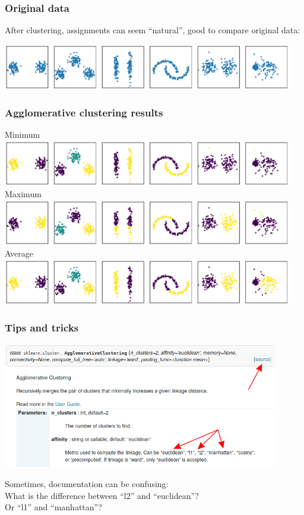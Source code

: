 \documentclass[Nike]{tuberlinbeamer}
\begin{document}
\begin{frame}
  \frametitle{Original data}
  After clustering, assignments can seem ``natural'', good to compare original data:
  \begin{center}
    \centering\includegraphics[width=0.95\textwidth]{sample_clusters.pdf}
  \end{center}
\end{frame}

\begin{frame}
  \frametitle{Agglomerative clustering results}
  \begin{center}
    \scriptsize Minimum
    \centering\includegraphics[width=0.95\textwidth]{agglomerative_clusters_minimum_linkage.pdf}
    \pause
    \scriptsize Maximum
    \centering\includegraphics[width=0.95\textwidth]{agglomerative_clusters_complete_linkage.pdf}
    \pause
    \scriptsize Average
    \centering\includegraphics[width=0.95\textwidth]{agglomerative_clusters_average_linkage.pdf}
  \end{center}
\end{frame}

\begin{frame}
  \frametitle{Tips and tricks}
  \begin{center}
   \centering\includegraphics[width=0.90\textwidth]{sklearn_API_doc.png}
  \end{center}
  Sometimes, documentation can be confusing:
  \\
  What is the difference between ``l2'' and ``euclidean''?
  \\
  Or ``l1'' and ``manhattan''?
\end{frame}
\end{document}
